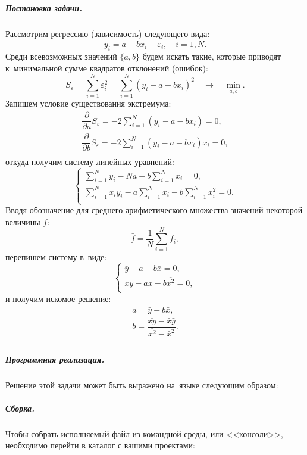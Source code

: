 \subparagraph{Постановка задачи.}
Рассмотрим регрессию (зависимость) следующего вида:
\begingroup
\newcommand{\SumN}{\ensuremath{\sum\limits_{i=1}^{N}}}
\[
y_i = a + b x_i + \varepsilon_i,\quad i = \overline{1, N}.
\]
Среди всевозможных значений \(\{ a, b \}\) будем искать такие, которые приводят к~минимальной сумме квадратов отклонений (ошибок):
\[
S_{\varepsilon} = \SumN \varepsilon_i^2 = \SumN (y_i - a - b x_i)^2\quad\rightarrow\quad \min\limits_{a, b}.
\]
Запишем условие существования экстремума:
\[
\begin{array}{l}
    \dfrac{\partial}{\partial a} S_{\varepsilon} = -2 \SumN (y_i - a - b x_i) = 0, \\[2ex]
    \dfrac{\partial}{\partial b} S_{\varepsilon} = -2 \SumN (y_i - a - b x_i) x_i = 0, \\
\end{array}
\]
откуда получим систему линейных уравнений:
\[
\left\{ \begin{array}{l}
    \SumN y_i - N a - b\SumN x_i = 0, \\[2ex]
    \SumN x_i y_i - a\SumN x_i - b\SumN x_i^2 = 0. \\
\end{array} \right.
\]
Вводя обозначение для среднего арифметического множества значений некоторой величины \(f\):
\[
\bar f = \dfrac{1}{N}\SumN f_i,
\]
перепишем систему в~виде:
\[
\left\{ \begin{array}{l}
    \bar y - a - b\bar x = 0, \\
    \overline{x y} - a\bar x - b\overline{x^2} = 0, \\
\end{array} \right.
\]
и получим искомое решение:
\[
\boxed{ \begin{array}{l}
        a = \bar y - b\bar x, \\
        b = \dfrac{\overline{x y} - \bar x\bar y}{\overline{x^2} - \bar x^2}. \\
\end{array} }
\]
\endgroup



\subparagraph{Программная реализация.}
Решение этой задачи может быть выражено на~языке  следующим образом:\label{code:lsm}




\subparagraph{Сборка.}
Чтобы собрать исполняемый файл из командной среды, или <<консоли>>, необходимо перейти в каталог с вашими проектами:


